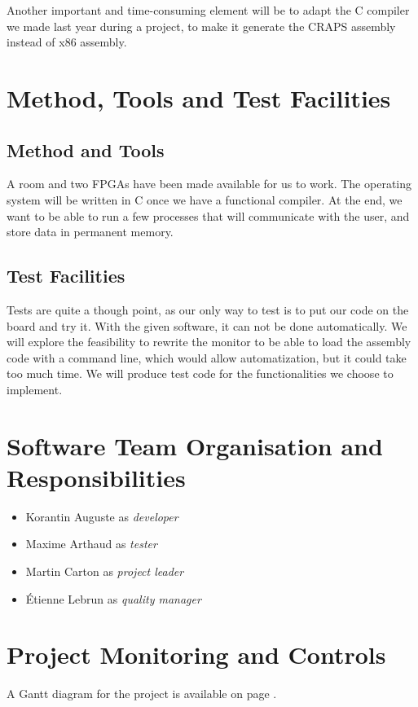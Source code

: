 \documentclass{article}
\begin{document}
    Another important and time-consuming element will be to adapt the C compiler
    we made last year during a project, to make it generate the CRAPS assembly
    instead of x86 assembly.

  \section{Method, Tools and Test Facilities}
    \subsection{Method and Tools}
    A room and two FPGAs have been made available for us to work.
    The operating system will be written in C once we have a functional
    compiler.
    At the end, we want to be able to run a few processes that will communicate
    with the user, and store data in permanent memory.

     \subsection{Test Facilities}
    Tests are quite a though point, as our only way to test is to put
    our code on the board and try it. With the given software, it can not be
    done automatically.
    We will explore the feasibility to rewrite the monitor to be able to load
    the assembly code with a command line, which would allow automatization, but
    it could take too much time.
    We will produce test code for the functionalities we choose to implement.

  \section{Software Team Organisation and Responsibilities}
    \begin{itemize}
      \item Korantin Auguste as \textit{developer}
      \item Maxime Arthaud as \textit{tester}
      \item Martin Carton as \textit{project leader}
      \item Étienne Lebrun as \textit{quality manager}
    \end{itemize}

  \section{Project Monitoring and Controls}
    A Gantt diagram for the project is available on page \pageref{fig:gantt}.
\end{document}
